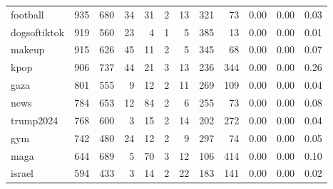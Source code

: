 \begin{tabular}{lrrrrrrrrrrr}
        football &    935 &    680 &                          34 &                           31 &    2 &     13 &           321 &                         73 &   0.00 &         0.00 &                                0.03 \\
    dogsoftiktok &    919 &    560 &                          23 &                            4 &    1 &      5 &           385 &                         13 &   0.00 &         0.00 &                                0.01 \\
          makeup &    915 &    626 &                          45 &                           11 &    2 &      5 &           345 &                         68 &   0.00 &         0.00 &                                0.07 \\
            kpop &    906 &    737 &                          44 &                           21 &    3 &     13 &           236 &                        344 &   0.00 &         0.00 &                                0.26 \\
            gaza &    801 &    555 &                           9 &                           12 &    2 &     11 &           269 &                        109 &   0.00 &         0.00 &                                0.04 \\
            news &    784 &    653 &                          12 &                           84 &    2 &      6 &           255 &                         73 &   0.00 &         0.00 &                                0.08 \\
       trump2024 &    768 &    600 &                           3 &                           15 &    2 &     14 &           202 &                        272 &   0.00 &         0.00 &                                0.04 \\
             gym &    742 &    480 &                          24 &                           12 &    2 &      9 &           297 &                         74 &   0.00 &         0.00 &                                0.05 \\
            maga &    644 &    689 &                           5 &                           70 &    3 &     12 &           106 &                        414 &   0.00 &         0.00 &                                0.10 \\
          israel &    594 &    433 &                           3 &                           14 &    2 &     22 &           183 &                        141 &   0.00 &         0.00 &                                0.02 \\

\end{tabular}
